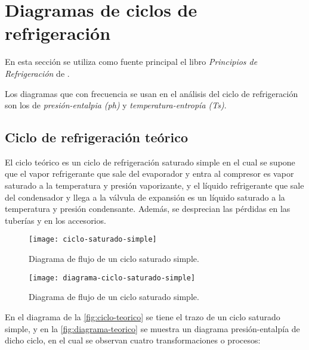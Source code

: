 \section{Diagramas de ciclos de refrigeración}\label{sec:1}

	En esta sección se utiliza como fuente principal el libro \emph{Principios de Refrigeración} de \cite[Capítulos 6 y 7]{dossat2004refrigeracion}.
	
	Los diagramas que con frecuencia se usan en el análisis del ciclo de refrigeración son los de \textit{presión-entalpia (ph)} y \textit{temperatura-entropía (Ts)}.
	
	
	\subsection{Ciclo de refrigeración teórico} \label{sec:ciclo-teorico}
	
	
		El ciclo teórico es un ciclo de refrigeración saturado simple en el cual se supone que el vapor refrigerante que sale del evaporador y entra al compresor es vapor saturado a la temperatura y presión vaporizante, y el líquido refrigerante que sale del condensador y llega a la válvula de expansión es un líquido saturado a la temperatura y presión condensante. Además, se desprecian las pérdidas en las tuberías y en los accesorios.

		
		\begin{figure}[h]
			\centering
			\texttt{[image: ciclo-saturado-simple]}
			\caption{Diagrama de flujo de un ciclo saturado simple.}
			\label{fig:ciclo-teorico}
		\end{figure}
		
		\begin{figure}[h]
			\centering
			\texttt{[image: diagrama-ciclo-saturado-simple]}
			\caption{Diagrama de flujo de un ciclo saturado simple.}
			\label{fig:diagrama-teorico}
		\end{figure}
		
		En el diagrama de la \autoref{fig:ciclo-teorico} se tiene el trazo de un ciclo saturado simple, y en la \autoref{fig:diagrama-teorico} se muestra un diagrama presión-entalpía de dicho ciclo, en el cual se observan cuatro transformaciones o procesos:
		
